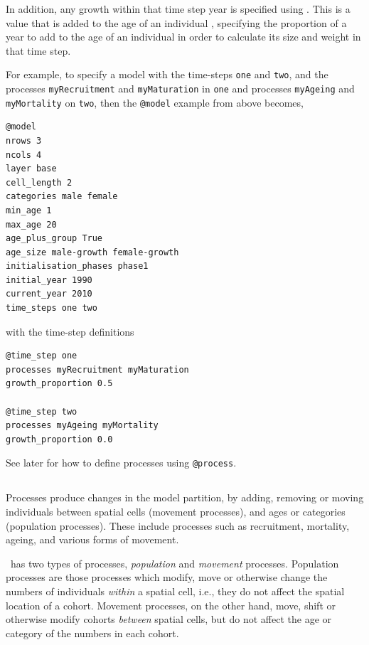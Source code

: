 In addition, any growth within that time step year is specified using . This is a value that is added to the age of an individual , specifying the proportion of a year to add to the age of an individual in order to calculate its size and weight in that time step. 

For example, to specify a model with the time-steps \texttt{one} and \texttt{two}, and the processes \texttt{myRecruitment} and \texttt{myMaturation} in \texttt{one} and processes \texttt{myAgeing} and \texttt{myMortality} on \texttt{two}, then the \texttt{@model} example from above becomes,
{\small{\begin{verbatim}
@model
nrows 3
ncols 4
layer base
cell_length 2
categories male female
min_age 1
max_age 20
age_plus_group True
age_size male-growth female-growth
initialisation_phases phase1
initial_year 1990
current_year 2010
time_steps one two
\end{verbatim}}}

with the time-step definitions 
{\small{\begin{verbatim}
@time_step one
processes myRecruitment myMaturation
growth_proportion 0.5

@time_step two
processes myAgeing myMortality
growth_proportion 0.0
\end{verbatim}}}

See later for how to define processes using \texttt{@process}. 

\subsection{}

Processes produce changes in the model partition, by adding, removing or moving individuals between spatial cells (movement processes), and ages or categories (population processes). These include processes such as recruitment, mortality, ageing, and various forms of movement.

\SPM\ has two types of processes, \emph{population} and \emph{movement} processes. Population processes are those processes which modify, move or otherwise change the numbers of individuals \emph{within} a spatial cell, i.e., they do not affect the spatial location of a cohort. Movement processes, on the other hand, move, shift or otherwise modify cohorts \emph{between} spatial cells, but do not affect the age or category of the numbers in each cohort. 

